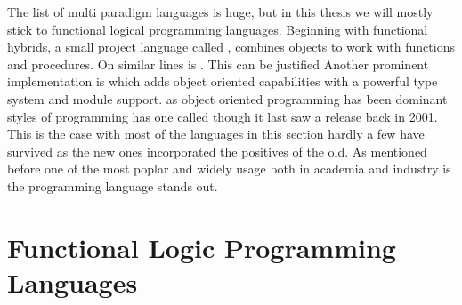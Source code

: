 \documentclass[thesis-solanki.tex]{subfiles}
\begin{document}
The list of multi paradigm languages is huge, but in this thesis we will mostly stick to functional logical programming languages. Beginning with functional hybrids, a small project language called  \cite{website:virgil}, combines
objects to work with functions and procedures.
On similar lines is  \cite{website:closwiki}.
This can be justified\yyy{}{\Large,}
Another prominent implementation is  \cite{website:ocamlwiki,website:ocamllang} which adds object
oriented capabilities with a powerful type system and module support.
as object oriented programming has been  dominant styles of programming  has one called  \cite{website:ohaskell}\yyy{}{\Large,} though it last saw a
release back in 2001.
This is the case with most of the languages in this section hardly a few have survived as the new ones incorporated
the positives of the old.
As mentioned before one of the most poplar \cite{website:langpop} and widely usage both in academia and industry is
the  \cite{website:scala} programming language stands out.


\section{Functional Logic Programming Languages}
\end{document}
